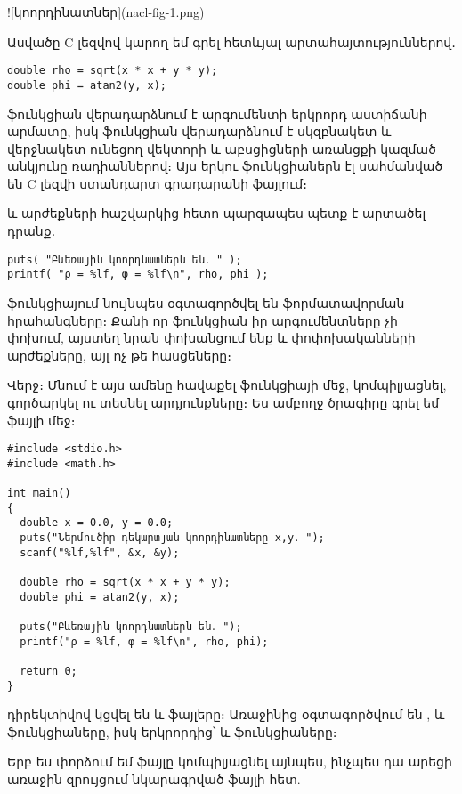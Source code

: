 ![կոորդինատներ](nacl-fig-1.png)

Ասվածը C լեզվով կարող եմ գրել հետևյալ արտահայտություններով․

\begin{verbatim}
double rho = sqrt(x * x + y * y);
double phi = atan2(y, x);
\end{verbatim}

 ֆունկցիան վերադարձնում է արգումենտի երկրորդ աստիճանի
արմատը, իսկ  ֆունկցիան վերադարձնում է  սկզբնակետ
և  վերջնակետ ունեցող վեկտորի և աբսցիցների առանցքի կազմած
անկյունը ռադիաններով։ Այս երկու ֆունկցիաներն էլ սահմանված են C լեզվի
ստանդարտ գրադարանի  ֆայլում։

 և  արժեքների հաշվարկից հետո պարզապես պետք է
արտածել դրանք․

\begin{verbatim}
puts( "Բևեռային կոորդնատներն են․ " );
printf( "ρ = %lf, φ = %lf\n", rho, phi );
\end{verbatim}

 ֆունկցիայում նույնպես օգտագործվել են 
ֆորմատավորման հրահանգները։ Քանի որ  ֆունկցիան իր
արգումենտները չի փոխում, այստեղ նրան փոխանցում ենք  և
 փոփոխականների արժեքները, այլ ոչ թե հասցեները։

Վերջ։ Մնում է այս ամենը հավաքել  ֆունկցիայի մեջ,
կոմպիլյացնել, գործարկել ու տեսնել արդյունքները։ Ես ամբողջ ծրագիրը գրել
եմ  ֆայլի մեջ։

\begin{Verbatim}
#include <stdio.h>
#include <math.h>

int main()
{
  double x = 0.0, y = 0.0;
  puts("Ներմուծիր դեկարտյան կոորդինատները x,y․ ");
  scanf("%lf,%lf", &x, &y);

  double rho = sqrt(x * x + y * y);
  double phi = atan2(y, x);

  puts("Բևեռային կոորդնատներն են․ ");
  printf("ρ = %lf, φ = %lf\n", rho, phi);

  return 0;
}
\end{Verbatim}

 դիրեկտիվով կցվել են  և
 ֆայլերը։ Առաջինից օգտագործվում են ,
 և  ֆունկցիաները, իսկ երկրորդից՝
 և  ֆունկցիաները։

Երբ ես փորձում եմ  ֆայլը կոմպիլյացնել այնպես, ինչպես դա
արեցի առաջին զրույցում նկարագրված  ֆայլի հետ.

